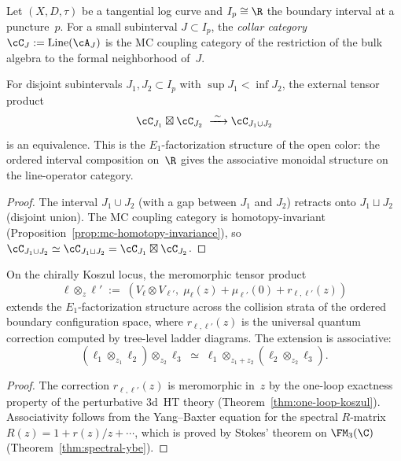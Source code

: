\begin{construction}
\label{constr:local-collar-categories}
Let $(X, D, \tau)$ be a tangential log curve and
$I_p \cong \R$ the boundary interval at a puncture~$p$.
For a small subinterval $J \subset I_p$, the \emph{collar category}
$\cC_J := \operatorname{Line}(\cA_J)$
is the MC coupling category of the restriction of the bulk algebra
to the formal neighborhood of~$J$.
\end{construction}

\begin{theorem}
\label{thm:e1-factorization-disjoint}
For disjoint subintervals $J_1, J_2 \subset I_p$ with
$\sup J_1 < \inf J_2$, the external tensor product
\[
  \cC_{J_1} \boxtimes \cC_{J_2}
  \;\xrightarrow{\;\sim\;}
  \cC_{J_1 \cup J_2}
\]
is an equivalence.  This is the $E_1$-factorization structure of
the open color: the ordered interval composition on~$\R$ gives
the associative monoidal structure on the line-operator category.
\end{theorem}

\begin{proof}
The interval $J_1 \cup J_2$ (with a gap between $J_1$ and $J_2$)
retracts onto $J_1 \sqcup J_2$ (disjoint union).  The MC
coupling category is homotopy-invariant
(Proposition~\ref{prop:mc-homotopy-invariance}), so
$\cC_{J_1 \cup J_2} \simeq \cC_{J_1 \sqcup J_2}
= \cC_{J_1} \boxtimes \cC_{J_2}$.
\end{proof}

\begin{theorem}
\label{thm:collision-extension}
On the chirally Koszul locus, the meromorphic tensor product
\[
  \ell \otimes_z \ell'
  \;:=\;
  (V_\ell \otimes V_{\ell'},\;
  \mu_\ell(z) + \mu_{\ell'}(0) + r_{\ell,\ell'}(z))
\]
extends the $E_1$-factorization structure across the collision
strata of the ordered boundary configuration space, where
$r_{\ell,\ell'}(z)$ is the universal quantum correction computed
by tree-level ladder diagrams.  The extension is associative:
\[
  (\ell_1 \otimes_{z_1} \ell_2) \otimes_{z_2} \ell_3
  \;\simeq\;
  \ell_1 \otimes_{z_1 + z_2} (\ell_2 \otimes_{z_2} \ell_3).
\]
\end{theorem}

\begin{proof}
The correction $r_{\ell,\ell'}(z)$ is meromorphic in~$z$ by the
one-loop exactness property of the perturbative 3d~HT theory
(Theorem~\ref{thm:one-loop-koszul}).  Associativity follows from
the Yang--Baxter equation for the spectral $R$-matrix
$R(z) = 1 + r(z)/z + \cdots$, which is proved by Stokes' theorem
on $\FM_3(\C)$
(Theorem~\ref{thm:spectral-ybe}).
\end{proof}

